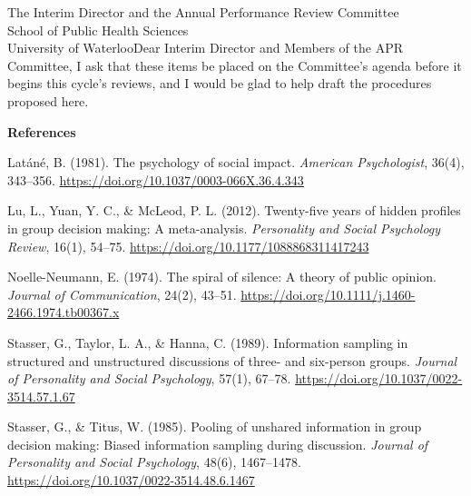 \begin{aprletter}{%
The Interim Director and the Annual Performance Review Committee\\
School of Public Health Sciences\\
University of Waterloo}{Dear Interim Director and Members of the APR Committee,}
I ask that these items be placed on the Committee's agenda before it begins this cycle's reviews, and I would be glad to help draft the procedures proposed here.

{\small
\raggedright
\par\medskip\noindent\textbf{References}\par\smallskip
\noindent Lat\'an\'e, B. (1981). The psychology of social impact. \emph{American Psychologist}, 36(4), 343--356. \url{https://doi.org/10.1037/0003-066X.36.4.343}\par
\noindent Lu, L., Yuan, Y. C., \& McLeod, P. L. (2012). Twenty-five years of hidden profiles in group decision making: A meta-analysis. \emph{Personality and Social Psychology Review}, 16(1), 54--75. \url{https://doi.org/10.1177/1088868311417243}\par
\noindent Noelle-Neumann, E. (1974). The spiral of silence: A theory of public opinion. \emph{Journal of Communication}, 24(2), 43--51. \url{https://doi.org/10.1111/j.1460-2466.1974.tb00367.x}\par
\noindent Stasser, G., Taylor, L. A., \& Hanna, C. (1989). Information sampling in structured and unstructured discussions of three- and six-person groups. \emph{Journal of Personality and Social Psychology}, 57(1), 67--78. \url{https://doi.org/10.1037/0022-3514.57.1.67}\par
\noindent Stasser, G., \& Titus, W. (1985). Pooling of unshared information in group decision making: Biased information sampling during discussion. \emph{Journal of Personality and Social Psychology}, 48(6), 1467--1478. \url{https://doi.org/10.1037/0022-3514.48.6.1467}\par
}
\end{aprletter}
